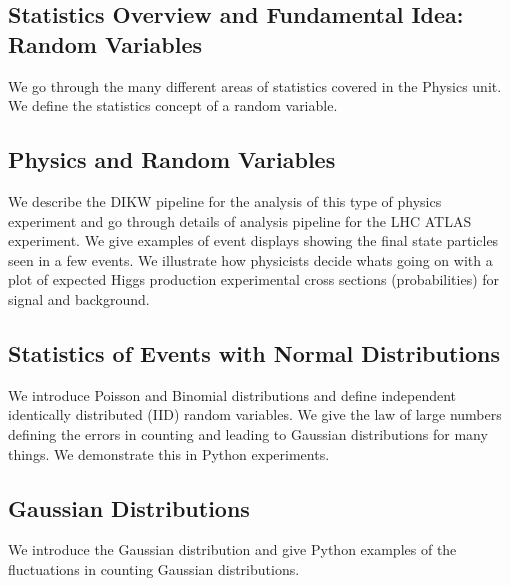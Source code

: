 \subsection{Statistics Overview and Fundamental Idea: Random
  Variables}

We go through the many different areas of statistics covered in the
Physics unit. We define the statistics concept of a random variable.


\subsection{Physics and Random Variables}


We describe the DIKW pipeline for the analysis of this type of physics
experiment and go through details of analysis pipeline for the LHC ATLAS
experiment. We give examples of event displays showing the final state
particles seen in a few events. We illustrate how physicists decide
whats going on with a plot of expected Higgs production experimental
cross sections (probabilities) for signal and background.



\subsection{Statistics of Events with Normal Distributions}

We introduce Poisson and Binomial distributions and define independent
identically distributed (IID) random variables. We give the law of large
numbers defining the errors in counting and leading to Gaussian
distributions for many things. We demonstrate this in Python
experiments.


\subsection{Gaussian Distributions}

We introduce the Gaussian distribution and give Python examples of the
fluctuations in counting Gaussian distributions.

